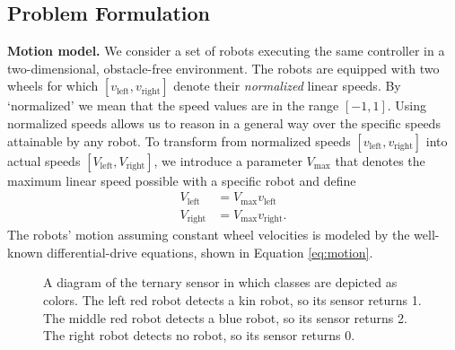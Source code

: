 \documentclass[letterpaper, 10 pt, conference]{ieeeconf}
\newcommand{\myparagraph}[1]{\textbf{#1.}}
\begin{document}
\subsection{Problem Formulation}

\newcommand{\vL}{\ensuremath{v_{\text{left}}}}
\newcommand{\vR}{\ensuremath{v_{\text{right}}}}
\newcommand{\vaL}{\ensuremath{V_{\text{left}}}}
\newcommand{\vaR}{\ensuremath{V_{\text{right}}}}
\newcommand{\VM}{\ensuremath{V_{\text{max}}}}
\myparagraph{Motion model}
We consider a set of robots executing the same controller in a two-dimensional,
obstacle-free environment. The robots are equipped with two wheels for which
$[\vL,\vR]$ denote their \emph{normalized} linear speeds. By `normalized' we
mean that the speed values are in the range $[-1, 1]$. Using normalized speeds
allows us to reason in a general way over the specific speeds attainable by any
robot. To transform from normalized speeds $[\vL,\vR]$ into actual speeds
$[\vaL,\vaR]$, we introduce a parameter $\VM$ that denotes the maximum linear
speed possible with a specific robot and define
\begin{align}
  \vaL &= \VM \vL\\
  \vaR &= \VM \vR.
\end{align}
The robots' motion assuming constant wheel velocities is modeled by the well-known differential-drive
equations, shown in Equation \eqref{eq:motion}.

\newcommand{\vPN}[2]{\ensuremath{v_{\text{#1}}}^{S=#2}}
\newcommand{\robot}[2]{%
  \filldraw[draw=#2,fill=#2!20] (#1) circle(5mm);
  \draw[draw=#2,->,-Stealth,rotate around={0:(#1)}] (#1) -- +(5mm,0);
  \fill[fill=gray!20] ($(#1)+(5mm,0)$) -- +( 45:1cm) -- +(-45:1cm) -- cycle;%
  \fill[fill=#2] ($(#1)+(5mm,0)$) circle (1mm);%
  }
  \begin{figure}[t]
    \centering
    \caption{A diagram of the ternary sensor in which classes are depicted
    as colors. The left red robot detects a kin robot, so its sensor
    returns 1. The middle red robot detects a blue robot, so its sensor
    returns 2. The right robot detects no robot, so its sensor returns
    0.}
    \label{fig:sensor}
  \end{figure}
\end{document}
